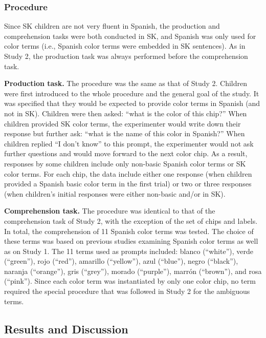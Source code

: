 \documentclass[
  english,
  ,man,floatsintext]{apa6}
\begin{document}
\hypertarget{procedure-1}{%
\subsubsection{Procedure}\label{procedure-1}}

Since SK children are not very fluent in Spanish, the production and comprehension tasks were both conducted in SK, and Spanish was only used for color terms (i.e., Spanish color terms were embedded in SK sentences). As in Study 2, the production task was always performed before the comprehension task.

\textbf{Production task.} The procedure was the same as that of Study 2. Children were first introduced to the whole procedure and the general goal of the study. It was specified that they would be expected to provide color terms in Spanish (and not in SK). Children were then asked: \enquote{what is the color of this chip?} When children provided SK color terms, the experimenter would write down their response but further ask: \enquote{what is the name of this color in Spanish?} When children replied \enquote{I don't know} to this prompt, the experimenter would not ask further questions and would move forward to the next color chip. As a result, responses by some children include only non-basic Spanish color terms or SK color terms. For each chip, the data include either one response (when children provided a Spanish basic color term in the first trial) or two or three responses (when children's initial responses were either non-basic and/or in SK).

\textbf{Comprehension task.} The procedure was identical to that of the comprehension task of Study 2, with the exception of the set of chips and labels. In total, the comprehension of 11 Spanish color terms was tested. The choice of these terms was based on previous studies examining Spanish color terms as well as on Study 1. The 11 terms used as prompts included: blanco (\enquote{white}), verde (\enquote{green}), rojo (\enquote{red}), amarillo (\enquote{yellow}), azul (\enquote{blue}), negro (\enquote{black}), naranja (\enquote{orange}), gris (\enquote{grey}), morado (\enquote{purple}), marrón (\enquote{brown}), and rosa (\enquote{pink}). Since each color term was instantiated by only one color chip, no term required the special procedure that was followed in Study 2 for the ambiguous terms.

\hypertarget{results-and-discussion-2}{%
\subsection{Results and Discussion}\label{results-and-discussion-2}}
\end{document}
